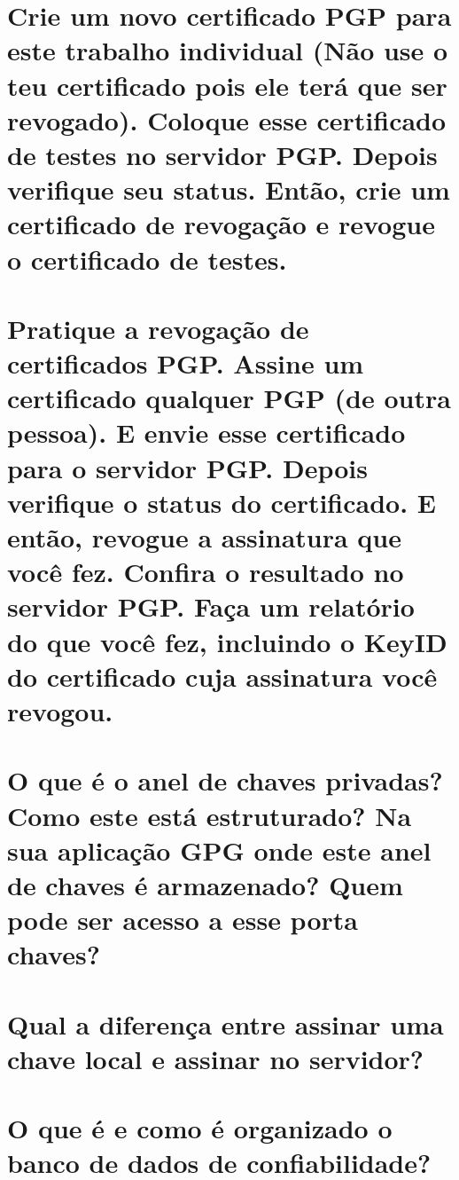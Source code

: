 \documentclass[
    article,            %
    11pt,               %
    oneside,            %
    a4paper,            %
    english,            %
    brazil,             %
    sumario=tradicional,
    ]{abntex2}
\begin{document}
\section{Crie um novo certificado PGP para este trabalho individual (Não use o teu certificado pois ele terá que ser revogado). Coloque esse certificado de testes no servidor PGP. Depois verifique seu status. Então, crie um certificado de revogação e revogue o certificado de testes.}


\section{Pratique a revogação de certificados PGP. Assine um certificado qualquer PGP (de outra pessoa). E envie esse certificado para o servidor PGP. Depois verifique o status do certificado. E então, revogue a assinatura que você fez. Confira o resultado no servidor PGP. Faça um relatório do que você fez, incluindo o KeyID do certificado cuja assinatura você revogou.}


\section{O que é o anel de chaves privadas? Como este está estruturado? Na sua aplicação GPG onde este anel de chaves é armazenado? Quem pode ser acesso a esse porta chaves?}


\section{Qual a diferença entre assinar uma chave local e assinar no servidor?}


\section{O que é e como é organizado o banco de dados de confiabilidade?}
\end{document}
